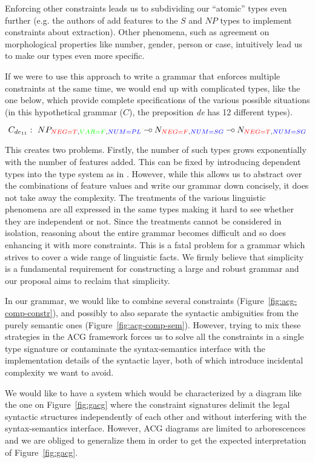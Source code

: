 \documentclass{llncs}
\def\limp {\mathbin{{-}\mkern-3.5mu{\circ}}}
\begin{document}
Enforcing other constraints leads us to subdividing our ``atomic'' types even
further (e.g. the authors of \cite{pogodalla2012controlling} add features to
the $S$ and $NP$ types to implement constraints about extraction). Other
phenomena, such as agreement on morphological properties like number, gender,
person or case, intuitively lead us to make our types even more specific.

If we were to use this approach to write a grammar that enforces multiple
constraints at the same time, we would end up with complicated types, like the
one below, which provide complete specifications of the various possible
situations (in this hypothetical grammar ($C$), the preposition \emph{de} has
12 different types).

$$
C_{de_{11}} :\ NP_{\textcolor{red}{NEG{=}T}, \textcolor{green}{VAR{=}F}, \textcolor{blue}{NUM{=}PL}}
\limp N_{\textcolor{red}{NEG{=}F},\textcolor{blue}{NUM{=}SG}}
\limp N_{\textcolor{red}{NEG{=}T},\textcolor{blue}{NUM{=}SG}}
$$

This creates two problems. Firstly, the number of such types grows
exponentially with the number of features added. This can be fixed by
introducing dependent types into the type system as in
\cite{de2007type}. However, while this allows us to abstract over the
combinations of feature values and write our grammar down concisely, it does
not take away the complexity. The treatments of the various linguistic
phenomena are all expressed in the same types making it hard to see whether
they are independent or not. Since the treatments cannot be considered in
isolation, reasoning about the entire grammar becomes difficult and so does
enhancing it with more constraints. This is a fatal problem for a grammar
which strives to cover a wide range of linguistic facts. We firmly believe
that simplicity is a fundamental requirement for constructing a large and
robust grammar and our proposal aims to reclaim that simplicity.

In our grammar, we would like to combine several constraints
(Figure~\ref{fig:acg-comp-constr}), and possibly to also separate the
syntactic ambiguities from the purely semantic ones
(Figure~\ref{fig:acg-comp-sem}).  However, trying to mix these strategies in
the ACG framework forces us to solve all the constraints in a single type
signature or contaminate the syntax-semantics interface with the
implementation details of the syntactic layer, both of which introduce
incidental complexity we want to avoid.

We would like to have a system which would be characterized by a diagram like
the one on Figure~\ref{fig:gacg} where the constraint signatures delimit the
legal syntactic structures independently of each other and without interfering
with the syntax-semantics interface. However, ACG diagrams are limited to
arborescences and we are obliged to generalize them in order to get
the expected interpretation of Figure~\ref{fig:gacg}.
\end{document}
